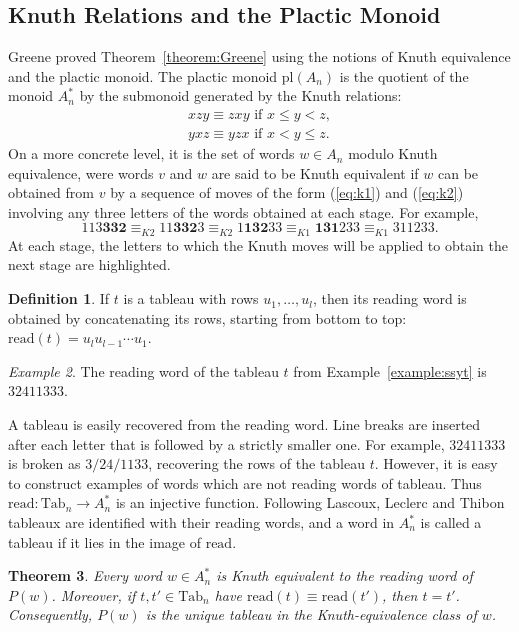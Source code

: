 \documentclass[10pt]{amsproc}
\newtheorem{theorem}{Theorem}[subsection]
\theoremstyle{definition}
\newtheorem{definition}[theorem]{Definition}
\theoremstyle{remark}
\newtheorem{example}[theorem]{Example}
\newcommand{\Tab}{\mathrm{Tab}}
\newcommand{\rc}[1]{\mathbf{#1}}
\newcommand{\rd}{\mathrm{read}}
\newcommand{\pl}{\mathrm{pl}}
\begin{document}
\subsection{Knuth Relations and the Plactic Monoid}
\label{sec:knuth-equivalence}
Greene \cite{Greene-schen} proved Theorem~\ref{theorem:Greene} using the notions of Knuth equivalence and the plactic monoid.
The plactic monoid $\pl(A_n)$ is the quotient of the monoid $A_n^*$ by the submonoid generated by the Knuth relations:
\begin{gather}
  \tag{$K1$}\label{eq:k1}
  xzy \equiv zxy \text{ if } x\leq y < z,
  \\
  \tag{$K2$}\label{eq:k2}
  yxz \equiv yzx \text{ if } x < y \leq z.
\end{gather}
On a more concrete level, it is the set of words $w\in A_n$ modulo Knuth equivalence, were words $v$ and $w$ are said to be Knuth equivalent if $w$ can be obtained from $v$ by a sequence of moves of the form (\ref{eq:k1}) and (\ref{eq:k2}) involving any three letters of the words obtained at each stage.
For example,
\begin{displaymath}
  113\rc{332}\equiv_{K2} 11\rc{332}3\equiv_{K2} 1\rc{132}33 \equiv_{K1} \rc{131}233 \equiv_{K1} 311233.
\end{displaymath}
At each stage, the letters to which the Knuth moves will be applied to obtain the next stage are highlighted.
\begin{definition}
  If $t$ is a tableau with rows $u_1,\dotsc,u_l$, then its reading word is obtained by concatenating its rows, starting from bottom to top: $\rd(t) = u_lu_{l-1}\dotsb u_1$.
\end{definition}
\begin{example}
  The reading word of the tableau $t$ from Example~\ref{example:ssyt} is $32411333$.
\end{example}
A tableau is easily recovered from the reading word.
Line breaks are inserted after each letter that is followed by a strictly smaller one.
For example, $32411333$ is broken as $3/24/1133$, recovering the rows of the tableau $t$.
However, it is easy to construct examples of words which are not reading words of tableau.
Thus $\rd:\Tab_n\to A_n^*$ is an injective function.
Following Lascoux, Leclerc and Thibon \cite{Lascoux} tableaux are identified with their reading words, and a word in $A_n^*$ is called a tableau if it lies in the image of $\rd$.
\begin{theorem}
  \label{theorem:unique-tab}
  Every word $w\in A_n^*$ is Knuth equivalent to the reading word of $P(w)$.
  Moreover, if $t,t'\in \Tab_n$ have $\rd(t)\equiv \rd(t')$, then $t=t'$.
  Consequently, $P(w)$ is the unique tableau in the Knuth-equivalence class of $w$.
\end{theorem}
\end{document}
